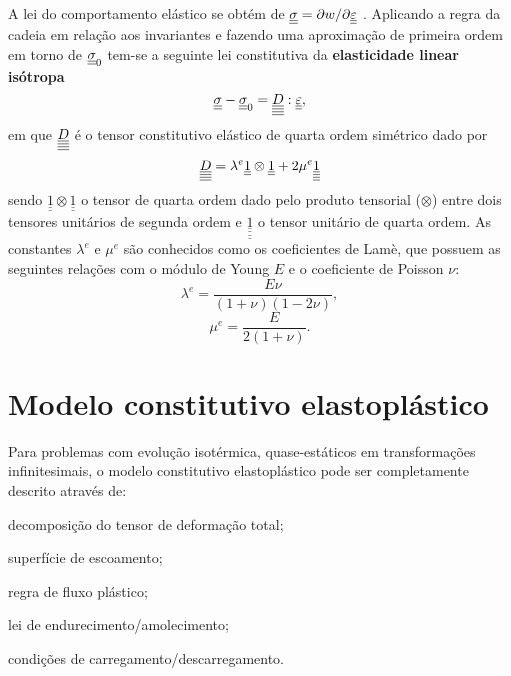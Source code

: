 A lei do comportamento elástico se obtém de $\underline{\underline \sigma} = \partial w / \partial \underline{\underline \varepsilon}$ . Aplicando a regra da cadeia em relação aos invariantes e fazendo uma aproximação de primeira ordem em torno de $\underline{\underline \sigma}_0$ tem-se a seguinte lei constitutiva da \textbf{elasticidade linear isótropa}
\begin{equation}
	\label{eq:lei_elasticidade}
	\underline{\underline \sigma} - \underline{\underline \sigma}_0 = \underline{\underline{\underline{\underline D}}}:\underline{\underline \varepsilon},
\end{equation}
em que $\underline{\underline{\underline{\underline D}}}$ é o tensor constitutivo elástico de quarta ordem simétrico dado por
\begin{equation}
	\label{eq:tensor_constitutivo_elastico}
 	\underline{\underline{\underline{\underline D}}} = \lambda^e \underline{\underline 1} \otimes \underline{\underline 1} + 2 \mu^e \underline{\underline{\underline{\underline 1}}}
\end{equation}
sendo $\underline{\underline 1} \otimes \underline{\underline 1}$ o tensor de quarta ordem dado pelo produto tensorial ($\otimes$) entre dois tensores unitários de segunda ordem e $\underline{\underline{\underline{\underline 1}}}$ o tensor unitário de quarta ordem. As constantes $\lambda^e$ e $\mu^e$ são conhecidos como os coeficientes de Lamè, que possuem as seguintes relações com o módulo de Young $E$ e o coeficiente de Poisson $\nu$:
\begin{equation}
	\label{eq:lambdae}
	\lambda^e = \frac{E \nu}{(1+\nu)(1-2\nu)},
\end{equation}
\begin{equation}
	\label{eq:mue}
	\mu^e = \frac{E}{2(1+\nu)}.
\end{equation}

\section{Modelo constitutivo elastoplástico}

Para problemas com evolução isotérmica, quase-estáticos em transformações infinitesimais, o modelo constitutivo elastoplástico pode ser completamente descrito através de:
\begin{alineas}
	\item decomposição do tensor de deformação total;
	\item superfície de escoamento;
	\item regra de fluxo plástico;
	\item lei de endurecimento/amolecimento;
	\item condições de carregamento/descarregamento.
\end{alineas}

